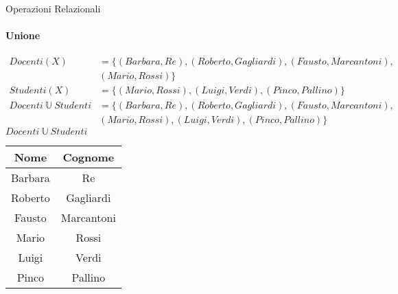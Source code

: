     \begin{frame}{Operazioni Relazionali}
        \framesubtitle{Unione}
        \vspace{-1cm}
        \begin{align*}Docenti(X) &= \{(Barbara,Re),(Roberto,Gagliardi),(Fausto,Marcantoni),\\&(Mario,Rossi)\}\\
        Studenti(X) &= \{(Mario,Rossi),(Luigi,Verdi),(Pinco,Pallino)\}\\
        Docenti~\mathbb{U}~Studenti &= \{(Barbara,Re),(Roberto,Gagliardi),(Fausto,Marcantoni),\\&(Mario,Rossi),(Luigi,Verdi),(Pinco,Pallino)\}
        \end{align*}
        \centering
        $Docenti~\mathbb{U}~Studenti$\\
        \begin{tabular}{|c|c|}
            \hline
            \rowcolor{cyan!30}Nome & Cognome \\
            \hline
            Barbara & Re \\ \hline
            Roberto & Gagliardi \\ \hline
            Fausto & Marcantoni \\ \hline
            \rowcolor{red!30}Mario & Rossi \\ \hline
            Luigi & Verdi \\ \hline
            Pinco & Pallino \\ \hline
        \end{tabular}
    \end{frame}

